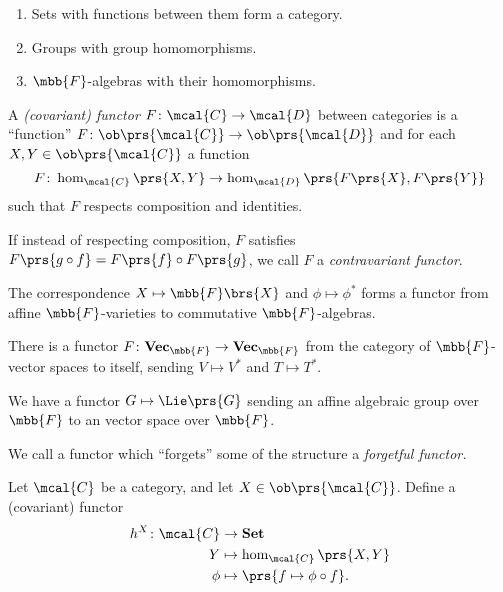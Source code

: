 \documentclass[10pt,a4paper,twoside,openany,hidelinks]{book}
\begin{document}
\begin{example}
\begin{enumerate}
\item Sets with functions between them form a category.
\item Groups with group homomorphisms.
\item $\mbb{F}$-algebras with their homomorphisms.
\end{enumerate}
\end{example}

\begin{definition}[Functor]
A \emph{(covariant) functor} $F \colon \mcal{C} \to \mcal{D}$ between categories is a ``function'' $F \colon \ob\prs{\mcal{C}} \to \ob\prs{\mcal{D}}$ and for each $X,Y \in \ob\prs{\mcal{C}}$ a function
\[F \colon \hom_{\mcal{C}}\prs{X,Y} \to \hom_{\mcal{D}}\prs{F\prs{X},F\prs{Y}}\]
such that $F$ respects composition and identities.
\end{definition}

\begin{definition}
If instead of respecting composition, $F$ satisfies $F\prs{g \circ f} = F\prs{f} \circ F\prs{g}$, we call $F$ a \emph{contravariant functor}.
\end{definition}

\begin{example}
The correspondence $X \mapsto \mbb{F}\brs{X}$ and $\phi \mapsto \phi^*$ forms a functor from affine $\mbb{F}$-varieties to commutative $\mbb{F}$-algebras.
\end{example}

\begin{example}
There is a functor $F \colon \mathbf{Vec}_{\mbb{F}} \to \mathbf{Vec}_{\mbb{F}}$ from the category of $\mbb{F}$-vector spaces to itself, sending $V \mapsto V^*$ and $T \mapsto T^*$.
\end{example}

\begin{example}
We have a functor $G \mapsto \Lie\prs{G}$ sending an affine algebraic group over $\mbb{F}$ to an vector space over $\mbb{F}$.
\end{example}

\begin{definition}
We call a functor which ``forgets'' some of the structure a \emph{forgetful functor.}
\end{definition}

\begin{definition}
Let $\mcal{C}$ be a category, and let $X \in \ob\prs{\mcal{C}}$. Define a (covariant) functor
\begin{align*}
h^X \colon \mcal{C} &\to \mathbf{Set} \\
Y &\mapsto \hom_{\mcal{C}}\prs{X,Y} \\
\phi &\mapsto \prs{f \mapsto \phi \circ f} \text{.}
\end{align*}
\end{definition}
\end{document}
